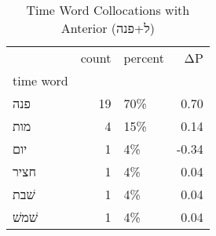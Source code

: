 \begin{table}[htbp!]
\centering
\caption{Time Word Collocations with Anterior (ל+פנה)}
\label{table:antל+פנה_head_cpd}
\begin{tabular}{lrlr}
\toprule
{} &  count & percent &    ΔP \\
time word &        &         &       \\
\midrule
פנה       &     19 &     70\% &  0.70 \\
מות       &      4 &     15\% &  0.14 \\
יום       &      1 &      4\% & -0.34 \\
חציר      &      1 &      4\% &  0.04 \\
שׁבת      &      1 &      4\% &  0.04 \\
שׁמשׁ     &      1 &      4\% &  0.04 \\
\bottomrule
\end{tabular}
\end{table}
